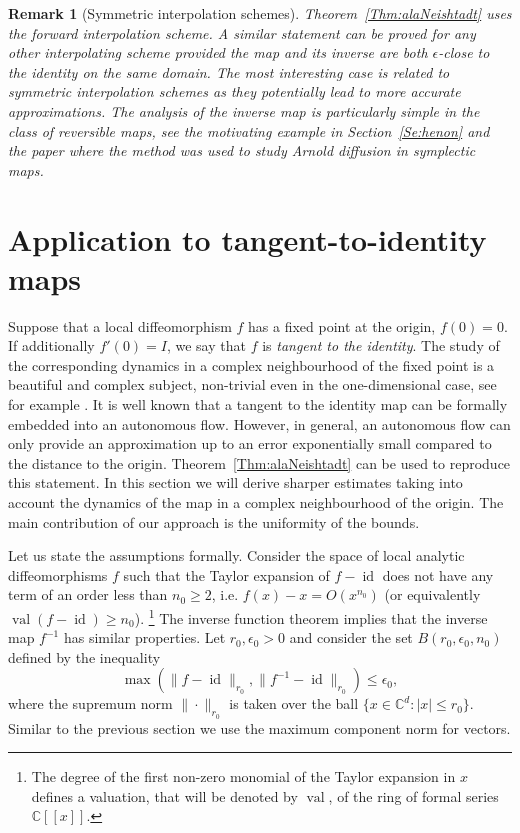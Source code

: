 \documentclass[a4paper,12pt]{article}
\newcommand{\C}{\mathbb{C}}
\newcommand\id{\operatorname{id}}
\newtheorem{remark}[thm]{Remark}
\begin{document}
\begin{remark}[Symmetric interpolation schemes]
Theorem~\ref{Thm:alaNeishtadt} uses the forward interpolation scheme. A similar statement can be proved for any
other interpolating scheme provided the map and its inverse 
are both  $\epsilon$-close to the identity on the same domain.
The most interesting case is related to symmetric interpolation schemes as they potentially lead to more accurate approximations.  The analysis
of the inverse map is particularly simple in the class of reversible maps, see the motivating example in Section~\ref{Se:henon} and the paper \cite{GelfreichV18}
where the method was used to study Arnold diffusion
in symplectic maps.    
\end{remark}




\section{Application to tangent-to-identity maps
\label{Se:fixedpoint}}

Suppose that a local diffeomorphism $f$ has a fixed point
at the origin, $f(0)=0$. If additionally $f'(0)=I$,
we say that $f$ is  {\em tangent to the identity}. The
study of the corresponding dynamics in a complex neighbourhood
of the fixed point is a beautiful and complex subject,
non-trivial even in the one-dimensional case,
see for example \cite{Voronin1981,Ecalle1985,Gelfreich1998,Hakim1998,Abate2001}.
 It is well known that a tangent to the identity map can be formally embedded into an
 autonomous flow. However, in general, an autonomous flow can only provide an approximation up to an error exponentially small compared to the distance to the origin.
Theorem~\ref{Thm:alaNeishtadt} can be used to 
reproduce this statement. In this section we will derive sharper estimates  
taking into account  the  dynamics of the map in a complex neighbourhood of the origin.
The main contribution of our approach is
the uniformity of the  bounds.

Let us state the assumptions formally.
Consider the space of local analytic diffeomorphisms  $f$ 
such that the Taylor expansion of $f-\operatorname{id}$ 
does not have any term of an order less than ${n_0}\ge 2$,
i.e. $f(x)-x=O(x^{n_0})$  (or equivalently $\operatorname{val}(f-\operatorname{id})\ge n_0$).
\footnote{
The degree of the first non-zero monomial of the Taylor expansion in 
 $x$ defines a valuation, that will be denoted by $\operatorname{val}$, of the ring
 of formal series $\mathbb{C}[[x]]$.}
The inverse function theorem implies that 
 the inverse map $f^{-1}$ has similar properties.
 Let $r_0,\epsilon_0>0$ and
consider the set $B(r_0,\epsilon_0,{n_0})$ 
 defined by the inequality 
\begin{equation}\label{Eq:balleps0}
\max\left(\|f-\id\|_{r_0},\|f^{-1}-\id\|_{r_0}\right)\le \epsilon_0,
\end{equation}
where the supremum norm $\|\cdot\|_{r_0}$ is taken over 
the ball $\{x\in\C^d:|x|\le r_0 \}$.
Similar to the previous section we use the maximum 
component norm for vectors. 
\end{document}
